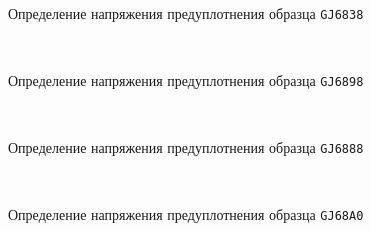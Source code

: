     \begin{figure}
        {\centering
        \small
            \hfill 
            \\
            \hfill  
            \hfill 
            }
            \caption{Определение напряжения предуплотнения образца \texttt{GJ6838}}
            \label{img:6838}
    \end{figure}
    
    \begin{figure}
        {\centering
        \small
            \hfill 
            \\
            \hfill  
            \hfill 
            }
            \caption{Определение напряжения предуплотнения образца \texttt{GJ6898}}
            \label{img:6898}
    \end{figure}
    
    \begin{figure}
        {\centering
        \small
            \hfill 
            \\
            \hfill  
            \hfill 
            }
            \caption{Определение напряжения предуплотнения образца \texttt{GJ6888}}
            \label{img:6888}
    \end{figure}
    
    \begin{figure}
        {\centering
        \small
            \hfill 
            \\
            \hfill  
            \hfill 
            }
            \caption{Определение напряжения предуплотнения образца \texttt{GJ68A0}}
            \label{img:68A0}
    \end{figure}
    
